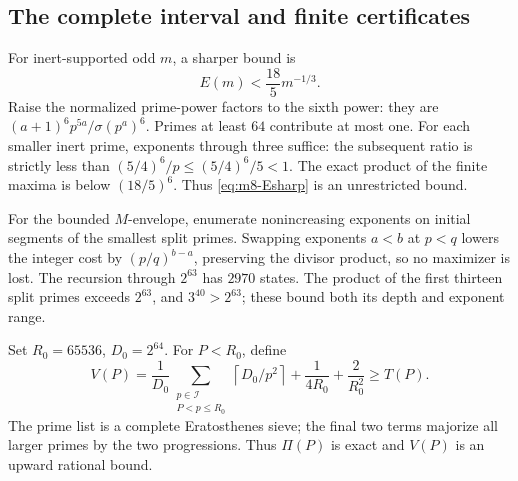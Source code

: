 \subsection{The complete interval and finite certificates}

For inert-supported odd \(m\), a sharper bound is
\begin{equation}
                         E(m)<\frac{18}{5}m^{-1/3}.            \label{eq:m8-Esharp}
\end{equation}
Raise the normalized prime-power factors to the sixth power:
they are
\((a+1)^6p^{5a}/\sigma(p^a)^6\).
Primes at least \(64\) contribute at most one.
For each smaller inert prime, exponents through three suffice:
the subsequent ratio is strictly less than
\((5/4)^6/p\le(5/4)^6/5<1\).
The exact product of the finite maxima is below \((18/5)^6\).
Thus \eqref{eq:m8-Esharp} is an unrestricted bound.

For the bounded \(M\)-envelope, enumerate nonincreasing exponents
on initial segments of the smallest split primes.
Swapping exponents \(a<b\) at \(p<q\) lowers the integer cost
by \((p/q)^{b-a}\), preserving the divisor product, so no
maximizer is lost. The recursion through \(2^{63}\) has \(2970\)
states. The product of the first thirteen split primes exceeds
\(2^{63}\), and \(3^{40}>2^{63}\); these bound both its depth
and exponent range.

Set \(R_0=65536\), \(D_0=2^{64}\). For \(P<R_0\), define
\begin{equation}
 V(P)=\frac1{D_0}
       \sum_{\substack{p\in\mathcal I\\P<p\le R_0}}
                    \left\lceil D_0/p^2\right\rceil
                   +\frac1{4R_0}+\frac2{R_0^2}\ge T(P).       \label{eq:m8-V}
\end{equation}
The prime list is a complete Eratosthenes sieve; the final two
terms majorize all larger primes by the two progressions.
Thus \(\Pi(P)\) is exact and \(V(P)\) is an upward rational bound.

